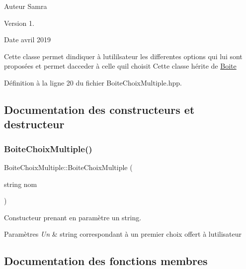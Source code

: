 \begin{DoxyAuthor}{Auteur}
Samra 
\end{DoxyAuthor}
\begin{DoxyVersion}{Version}
1. 
\end{DoxyVersion}
\begin{DoxyDate}{Date}
avril 2019
\end{DoxyDate}
Cette classe permet d\textquotesingle{}indiquer à l\textquotesingle{}utililsateur les differentes options qui lui sont proposées et permet d\textquotesingle{}acceder à celle qu\textquotesingle{}il choisit Cette classe hérite de \hyperlink{class_boite}{Boite} 

Définition à la ligne 20 du fichier Boite\+Choix\+Multiple.\+hpp.



\subsection{Documentation des constructeurs et destructeur}
\mbox{\label{class_boite_choix_multiple_a33c5d1f1b62448952ea8503cdb7ade50}} 
\subsubsection{\texorpdfstring{Boite\+Choix\+Multiple()}{BoiteChoixMultiple()}}
{\footnotesize\ttfamily Boite\+Choix\+Multiple\+::\+Boite\+Choix\+Multiple (\begin{DoxyParamCaption}\item[{string}]{nom }\end{DoxyParamCaption})}



Constucteur prenant en paramètre un string. 


\begin{DoxyParams}{Paramètres}
{\em Un} & string correspondant à un premier choix offert à l\textquotesingle{}utilisateur \\
\hline
\end{DoxyParams}


\subsection{Documentation des fonctions membres}
\mbox{\label{class_boite_choix_multiple_aa0acac137fd87665bc4225e1eec6e387}} 

